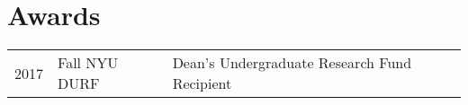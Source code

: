 

\section{Awards} 
\begin{tabular}{rll}
2017	     & Fall NYU DURF  & Dean's Undergraduate Research Fund Recipient\\
\end{tabular}
\sectionsep
